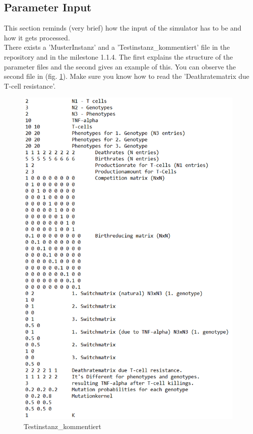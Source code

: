 \documentclass[a4paper,10pt]{scrartcl}
\begin{document}
	\subsection{Parameter Input} \label{subsec:PaInput}
	This section reminds (very brief) how the input of the simulator has to be and how it gets processed.\\
	There exists a 'MusterInstanz' and a 'Testinstanz\_kommentiert' file in the repository and in the milestone 1.1.4. The first explains the structure of the parameter files and the second gives an example of this. You can observe the second file in (fig. \ref{fig:CommentedParameterfile}). Make sure you know how to read the 'Deathratematrix due T-cell resistance'.
	\begin{figure}
		\centering
		\includegraphics[width=0.9\linewidth]{Bilder/CommentedParameterfile}
		\caption{Testinstanz\_kommentiert}
		\label{fig:CommentedParameterfile}
	\end{figure}
\end{document}
